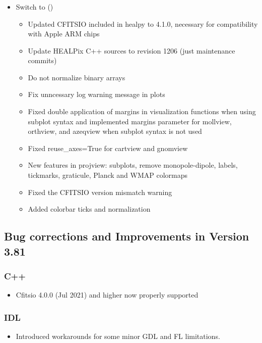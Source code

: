 \documentclass[12pt,twoside]{article}
\makeatletter
\newcommand{\nop}[1]{\Hy@raisedlink{\hypertarget{#1}{}}}
\newcommand{\mytarget}[1]{\nop{#1}}%
\newcommand{\mytarget}[1]{\label{#1}}
\makeatother
\begin{document}
\subsubsection[Python]{}
\begin{itemize}
\item Switch to 
  ()
  \begin{itemize}
  \item Updated CFITSIO included in healpy to 4.1.0, necessary for compatibility with Apple ARM chips
  \item Update HEALPix C++ sources to revision 1206 (just maintenance commits)
  \item Do not normalize binary arrays
  \item Fix unncessary log warning message in plots
  \item Fixed double application of margins in visualization functions when using subplot syntax and implemented margins parameter for mollview, orthview, and azeqview when subplot syntax is not used
  \item Fixed reuse\_axes=True for cartview and gnomview
  \item New features in projview: subplots, remove monopole-dipole, labels, tickmarks, graticule, Planck and WMAP colormaps
  \item Fixed the CFITSIO version mismatch warning
  \item Added colorbar ticks and normalization
  \end{itemize}
\end{itemize}
\subsection{Bug corrections and Improvements in Version 3.81}%
\label{sec:v381}\mytarget{install:v381}
\subsubsection[C++]{C++}
\begin{itemize}
 \item Cfitsio 4.0.0 (Jul 2021) and higher now properly supported
\end{itemize}

\subsubsection[IDL]{IDL}
\begin{itemize}
 \item Introduced workarounds for some minor GDL and FL limitations.
\end{itemize}
\end{document}
